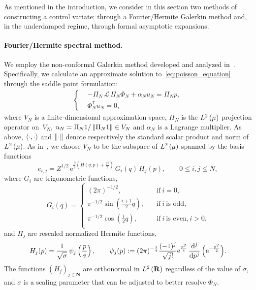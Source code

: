 \documentclass[11pt,a4paper]{article}
\newcommand{\e}{\mathrm{e}}
\newcommand{\nat}{\mathbf N}
\newcommand{\real}{\mathbf R}
\renewcommand{\t}{\mathsf T}
\theoremstyle{plain}
\numberwithin{equation}{section}
\renewcommand{\leq}{\leqslant}
\begin{document}
As mentioned in the introduction,
we consider in this section two methods of constructing a control variate:
through a Fourier/Hermite Galerkin method and,
in the underdamped regime,
through formal asymptotic expansions.

\paragraph{Fourier/Hermite spectral method.}%
We employ the non-conformal Galerkin method developed and analyzed in~\cite{roussel2018spectral}.
Specifically, we calculate an approximate solution to~\eqref{eq:poisson_equation} through the saddle point formulation:
\begin{align}
  \label{eq:saddle_point_formutation}
  \left\{
    \begin{aligned}
       & - \Pi_N \, \mathcal L \, \Pi_N \Phi_N + \alpha_N u_N = \Pi_N p, \\
       & \Phi_N^\t u_N = 0,
    \end{aligned}
  \right.
\end{align}
where $V_N$ is a finite-dimensional approximation space,
$\Pi_N$ is the $\lp{2}{\mu}$ projection operator on~$V_N$,
$u_N = \Pi_N 1 / \norm{\Pi_N 1} \in V_N$
and $\alpha_N$ is a Lagrange multiplier.
As above,
$\ip{\cdot}{\cdot}$ and $\norm{\cdot}$ denote respectively the standard scalar product and norm of $\lp{2}{\mu}$.
As in~\cite{roussel2018spectral},
we choose $V_N$ to be the subspace of $\lp{2}{\mu}$ spanned by the basis functions
\begin{equation*}
  \label{eq:basis_functions}
  e_{i,j} = Z^{1/2} \, \e^{\frac{\beta}{2} \left( H(q,p) + \frac{z^2}{2} \right)}
  \, G_i(q) \, H_j(p), \qquad 0 \leq i,j \leq N,
\end{equation*}
where $G_i$ are trigonometric functions,
\begin{equation}
  \label{eq:definition_trigonometric_functions}
  G_i(q) =
  \left\{ \begin{aligned}
    (2 \pi)^{-1/2}, \quad & \text{if}~i = 0, \\
    \pi^{-1/2} \sin\left(\frac{i + 1}{2}q\right), \quad & \text{if}~i~\text{is odd}, \\
    \pi^{-1/2} \cos\left(\frac{i}{2}q\right), \quad & \text{if}~i~\text{is even}, i > 0. \\
  \end{aligned} \right.
\end{equation}
and $H_j$ are rescaled normalized Hermite functions,
\begin{equation}
  \label{eq:definition_hermite_functions}
  H_j(p) = \frac{1}{\sqrt{\sigma}} \, \psi_j \left( \frac{p}{\sigma} \right),
  \qquad \psi_j (p) := (2 \pi)^{-\frac{1}{4}} \frac{(-1)^j}{\sqrt{j!}} \e^{\frac{p^2}{4}} \, \derivative*{j}{p^j} \, \Bigl( \e^{- \frac{p^2}{2}} \Bigr).
\end{equation}
The functions $(H_j)_{j\in \nat}$ are orthonormal in $\lp{2}{\real}$ regardless of the value of $\sigma$,
and $\sigma$ is a scaling parameter that can be adjusted to better resolve $\Phi_N$.
\end{document}
